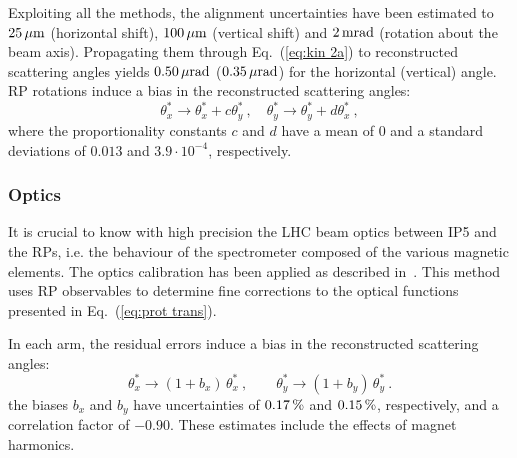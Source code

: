 Exploiting all the methods, the alignment uncertainties have been estimated to $25\,{\rm \mu m}$ (horizontal shift), $100\,{\rm \mu m}$ (vertical shift) and $2\,{\rm m rad}$ (rotation about the beam axis). Propagating them through Eq.~(\ref{eq:kin 2a}) to reconstructed scattering angles yields $0.50\,{\rm \mu rad}$ ($0.35\,{\rm \mu rad}$) for the horizontal (vertical) angle. RP rotations induce a bias in the reconstructed scattering angles:
\begin{equation}
\label{eq:alig rot bias}
	\theta_x^* \rightarrow \theta_x^* + c \theta_y^*\ ,\quad
	\theta_y^* \rightarrow \theta_y^* + d \theta_x^*\ ,
\end{equation}
where the proportionality constants $c$ and $d$ have a mean of 0 and a standard deviations of $0.013$ and $3.9\cdot10^{-4}$, respectively.





\subsubsection{Optics}
\label{sec:optics}

It is crucial to know with high precision the LHC beam optics between IP5 and the RPs, i.e. the behaviour of the spectrometer composed of the various magnetic elements. The optics calibration has been applied as described in~\cite{totem-optics}. This method uses RP observables to determine fine corrections to the optical functions presented in Eq.~(\ref{eq:prot trans}).

In each arm, the residual errors induce a bias in the reconstructed scattering angles:
\begin{equation}
\label{eq:opt bias}
	\theta_x^* \rightarrow (1 + b_x)\, \theta_x^*\ ,\qquad
	\theta_y^* \rightarrow (1 + b_y)\, \theta_y^*\ .
\end{equation}
the biases $b_x$ and $b_y$ have uncertainties of $0.17\,{\rm \%}$ and $0.15\,{\rm \%}$, respectively, and a correlation factor of $-0.90$.  These estimates include the effects of magnet harmonics.

